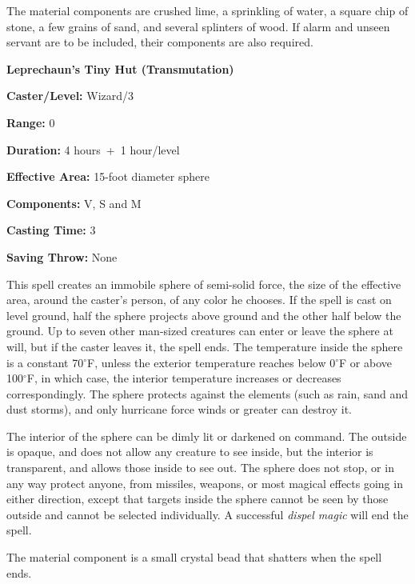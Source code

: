 \begin{multicols}{2}
The material components are crushed lime, a sprinkling of water, a square chip of stone, a few grains of sand, and several splinters of wood.  If alarm and unseen servant are to be included, their components are also required.
 
\vspace{1em}

\noindent
\begin{minipage}{\columnwidth}

\noindent \textbf{Leprechaun's Tiny Hut (Transmutation)}

\noindent \textbf{Caster/Level:} Wizard/3

\noindent \textbf{Range:} 0

\noindent \textbf{Duration:} 4 hours~+~1 hour/level

\noindent \textbf{Effective Area:} 15-foot diameter sphere

\noindent \textbf{Components:} V, S and M

\noindent \textbf{Casting Time:} 3

\noindent \textbf{Saving Throw:} None

\end{minipage}

This spell creates an immobile sphere of semi-solid force, the size of the effective area, around the caster's person, of any color he chooses.  If the spell is cast on level ground, half the sphere projects above ground and the other half below the ground.  Up to seven other man-sized creatures can enter or leave the sphere at will, but if the caster leaves it, the spell ends.  The temperature inside the sphere is a constant 70$^\circ$F, unless the exterior temperature reaches below 0$^\circ$F or above 100$^\circ$F, in which case, the interior temperature increases or decreases correspondingly.  The sphere protects against the elements (such as rain, sand and dust storms), and only hurricane force winds or greater can destroy it.

The interior of the sphere can be dimly lit or darkened on command.  The outside is opaque, and does not allow any creature to see inside, but the interior is transparent, and allows those inside to see out.  The sphere does not stop, or in any way protect anyone, from missiles, weapons, or most magical effects going in either direction, except that targets inside the sphere cannot be seen by those outside and cannot be selected individually.  A successful \textit{dispel magic} will end the spell.

The material component is a small crystal bead that shatters when the spell ends.


\end{multicols}
